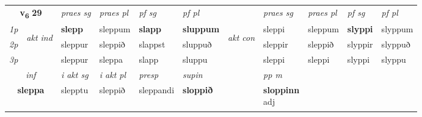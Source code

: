 \noindent
\begin{tabular}{lllllllllll} \toprule
\multicolumn{2}{c}{\textbf{v{\textsubscript{6}}} \Large{\textbf{29}}}  &  \textit{praes sg}  & \textit{praes pl}  &\textit{ pf sg} & \textit{pf pl} &  &  \textit{praes sg}  & \textit{praes pl}  & \textit{pf sg} & \textit{pf pl } \\*
	\cmidrule{3-6} \cmidrule{8-11}
 {\textit{1p}} & \multirow{3}{*}{\begin{turn}{90}\textit{akt ind}\end{turn}} & \textbf{slepp} & sleppum & \textbf{slapp} & \textbf{sluppum} & \multirow{3}{*}{\begin{turn}{90}\textit{akt con}\end{turn}} &sleppi & sleppum & \textbf{slyppi} & slyppum\\*
 {\textit{2p}} &  &  sleppur  & sleppið & slappst & sluppuð & & sleppir & sleppið & slyppir & slyppuð \\*
{\textit{3p}} &  & sleppur & sleppa & slapp & sluppu & & sleppi & sleppi& slyppi & slyppu \\*
\cmidrule{3-6} \cmidrule{8-11}

   \multicolumn{2}{c}{\textit{inf}}  & \textit{i akt sg} & \textit{i akt pl}   & \textit{presp} & \textit{supin}  && \textit{pp m} \\*
  \multicolumn{2}{c}{\textbf{sleppa}} & slepptu  & sleppið   & sleppandi &  \textbf{sloppið}  && \specialcell{\textbf{sloppinn} \\ adj\textbf{\textsubscript{}}} \\*
\end{tabular}

